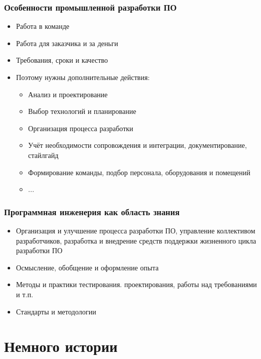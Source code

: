 \documentclass{../../slides-style}
\begin{document}
    \begin{frame}
        \frametitle{Особенности промышленной разработки ПО}
        \begin{itemize}
            \item Работа в команде
            \item Работа для заказчика и за деньги
            \item Требования, сроки и качество
            \item Поэтому нужны дополнительные действия:
            \begin{itemize}
                \item Анализ и проектирование
                \item Выбор технологий и планирование
                \item Организация процесса разработки
                \item Учёт необходимости сопровождения и интеграции, документирование, стайлгайд
                \item Формирование команды, подбор персонала, оборудования и помещений
                \item ...
            \end{itemize}
        \end{itemize}
    \end{frame}

    \begin{frame}
        \frametitle{Программная инженерия как область знания}
        \begin{itemize}
            \item Организация и улучшение процесса разработки ПО, управление коллективом разработчиков, разработка и внедрение средств поддержки жизненного цикла разработки ПО
            \item Осмысление, обобщение и оформление опыта
            \item Методы и практики тестирования. проектирования, работы над требованиями и т.п.
            \item Стандарты и методологии
        \end{itemize}
    \end{frame}

    \section{Немного истории}
\end{document}
